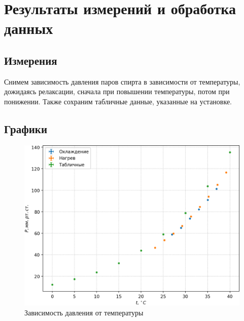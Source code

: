 \documentclass[a4paper,12pt]{article} %
\begin{document}
\newpage

\section{Результаты измерений и обработка данных}

\subsection*{Измерения}

Снимем зависимость давления паров спирта в зависимости от температуры, дожидаясь релаксации, сначала при повышении температуры, потом при понижении. Также сохраним табличные данные, указанные на установке.

\bigskip

\begin{minipage}{0.3\textwidth}
    
    \label{нагрев}
\end{minipage}
\begin{minipage}{0.3\textwidth}
    
    \label{охлаждение}
\end{minipage}
\begin{minipage}{0.3\textwidth}
    
    \label{табличные}
\end{minipage}

\subsection*{Графики}

\begin{figure}[h!]
\begin{center}
\includegraphics[width=1\textwidth]{P(t).png}
\caption{Зависимость давления от температуры}\label{pt}
\end{center}
\end{figure}
\end{document}
